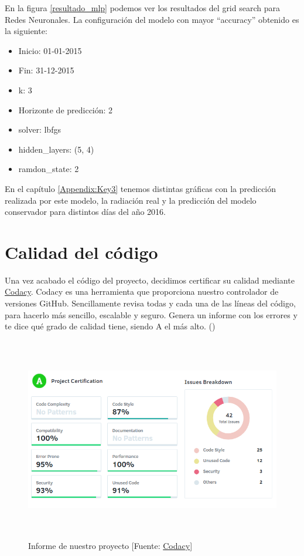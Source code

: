 En la figura \ref{resultado_mlp} podemos ver los resultados del grid search para Redes Neuronales. La configuración del modelo con mayor ``accuracy'' obtenido es la siguiente:

\begin{itemize}
\item Inicio: 01-01-2015
\item Fin: 31-12-2015
\item k: 3
\item Horizonte de predicción: 2
\item solver: lbfgs
\item hidden\_layers: (5, 4)
\item ramdon\_state: 2
\end{itemize}

En el capítulo \ref{Appendix:Key3} tenemos distintas gráficas con la predicción realizada por este modelo, la radiación real y la predicción del modelo conservador para distintos días del año 2016.


\section{Calidad del código}
\label{makereference7.4}

Una vez acabado el código del proyecto, decidimos certificar su calidad mediante \href{https://www.codacy.com}{Codacy}.
Codacy es una herramienta que proporciona nuestro controlador de versiones GitHub. Sencillamente revisa todas y cada una de las líneas del código, para hacerlo más sencillo, escalable y seguro. Genera un informe con los errores y te dice qué grado de calidad tiene, siendo A el más alto. (\cite{ARP:Codacy:2017})

\begin{figure}[htb]
	\begin{center}
		\includegraphics[height=3.5in]{figures/codacy.png}
		\caption{Informe de nuestro proyecto [Fuente: \href{https://www.codacy.com}{Codacy}] \label{codacy}}
	\end{center}
\end{figure}